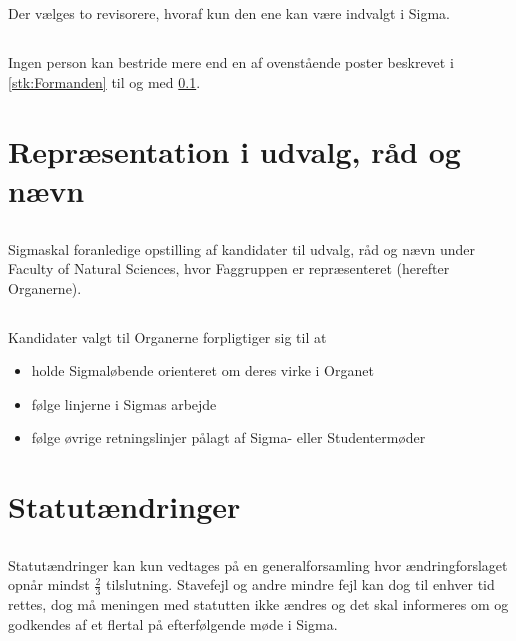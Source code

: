 \documentclass[danish,a4paper,twocolumn]{article}
\newcommand{\foreningen}{Sigma}
\newcommand{\fakultetet}{Faculty of Natural Sciences}
\begin{document}
\subsection{}\label{stk:revisorer}Der vælges to revisorere, hvoraf kun den ene kan være indvalgt i \foreningen.
\subsection{}Ingen person kan bestride mere end en af ovenstående poster beskrevet i \ref{stk:Formanden} til og med \ref{stk:revisorer}.

\section{Repræsentation i udvalg, råd og nævn}
\subsection{}\foreningen skal foranledige opstilling af kandidater til udvalg, råd og nævn under \fakultetet, hvor Faggruppen er repræsenteret (herefter Organerne).

\subsection{}Kandidater valgt til Organerne forpligtiger sig til at
\begin{itemize}
        \item holde \foreningen løbende orienteret om deres virke i Organet
        \item følge linjerne i \foreningen s arbejde
        \item følge øvrige retningslinjer pålagt af \foreningen- eller Studentermøder
\end{itemize}

\section{Statutændringer}\label{par:aendringer}
\subsection{}Statutændringer kan kun vedtages på en generalforsamling hvor ændringforslaget opnår mindst $\frac{2}{3}$ tilslutning. Stavefejl og andre mindre fejl kan dog til enhver tid rettes, dog må meningen med statutten ikke ændres og det skal informeres om og godkendes af et flertal på efterfølgende møde i \foreningen.
\end{document}
